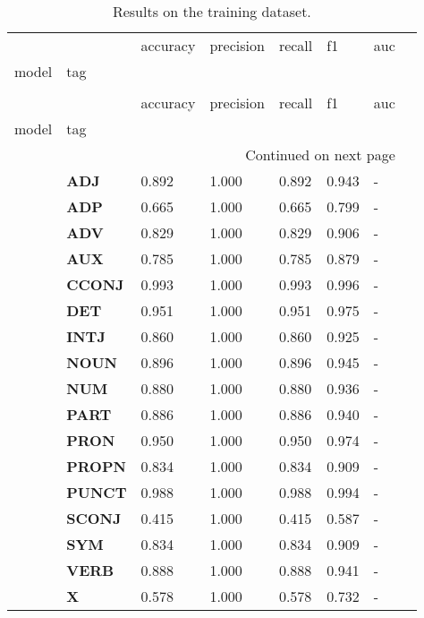 \begin{longtable}{|l||l||l||l||l||l||l||l|}
\caption{Results on the training dataset.} \label{tab::ex_2_train} \\
\toprule
 &  & accuracy & precision & recall & f1 & auc \\
model & tag &  &  &  &  &  \\
\midrule
\endfirsthead
\caption[]{Results on the training dataset.} \\
\toprule
 &  & accuracy & precision & recall & f1 & auc \\
model & tag &  &  &  &  &  \\
\midrule
\endhead
\midrule
\multicolumn{7}{r}{Continued on next page} \\
\midrule
\endfoot
\bottomrule
\endlastfoot
\multirow[t]{18}{*}{\textbf{Baseline}} & \textbf{ADJ} & 0.892 & 1.000 & 0.892 & 0.943 & - \\
\textbf{} & \textbf{ADP} & 0.665 & 1.000 & 0.665 & 0.799 & - \\
\textbf{} & \textbf{ADV} & 0.829 & 1.000 & 0.829 & 0.906 & - \\
\textbf{} & \textbf{AUX} & 0.785 & 1.000 & 0.785 & 0.879 & - \\
\textbf{} & \textbf{CCONJ} & 0.993 & 1.000 & 0.993 & 0.996 & - \\
\textbf{} & \textbf{DET} & 0.951 & 1.000 & 0.951 & 0.975 & - \\
\textbf{} & \textbf{INTJ} & 0.860 & 1.000 & 0.860 & 0.925 & - \\
\textbf{} & \textbf{NOUN} & 0.896 & 1.000 & 0.896 & 0.945 & - \\
\textbf{} & \textbf{NUM} & 0.880 & 1.000 & 0.880 & 0.936 & - \\
\textbf{} & \textbf{PART} & 0.886 & 1.000 & 0.886 & 0.940 & - \\
\textbf{} & \textbf{PRON} & 0.950 & 1.000 & 0.950 & 0.974 & - \\
\textbf{} & \textbf{PROPN} & 0.834 & 1.000 & 0.834 & 0.909 & - \\
\textbf{} & \textbf{PUNCT} & 0.988 & 1.000 & 0.988 & 0.994 & - \\
\textbf{} & \textbf{SCONJ} & 0.415 & 1.000 & 0.415 & 0.587 & - \\
\textbf{} & \textbf{SYM} & 0.834 & 1.000 & 0.834 & 0.909 & - \\
\textbf{} & \textbf{VERB} & 0.888 & 1.000 & 0.888 & 0.941 & - \\
\textbf{} & \textbf{X} & 0.578 & 1.000 & 0.578 & 0.732 & - \\

\end{longtable}
